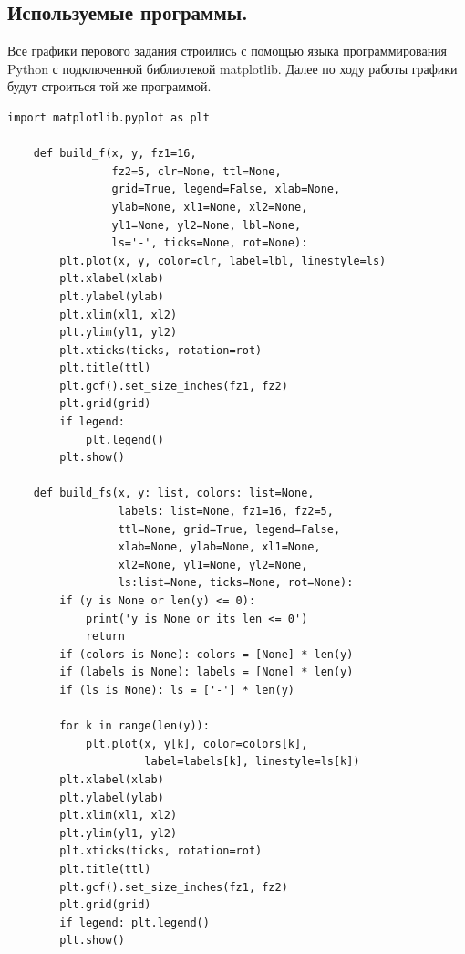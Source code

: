 \documentclass[a4paper, 12pt]{article}
\begin{document}
    \subsection{Используемые программы.}
    Все графики перового задания строились с помощью языка программирования Python с подключенной библиотекой matplotlib. Далее
    по ходу работы графики будут строиться той же программой. 
    \begin{lstlisting}[label=task1, caption={Файл с программой для построения графиков.}]
    import matplotlib.pyplot as plt

    def build_f(x, y, fz1=16,
                fz2=5, clr=None, ttl=None,
                grid=True, legend=False, xlab=None,
                ylab=None, xl1=None, xl2=None,
                yl1=None, yl2=None, lbl=None,
                ls='-', ticks=None, rot=None):
        plt.plot(x, y, color=clr, label=lbl, linestyle=ls)
        plt.xlabel(xlab)
        plt.ylabel(ylab)
        plt.xlim(xl1, xl2)
        plt.ylim(yl1, yl2)
        plt.xticks(ticks, rotation=rot)
        plt.title(ttl)
        plt.gcf().set_size_inches(fz1, fz2)
        plt.grid(grid)
        if legend:
            plt.legend()
        plt.show()
                
    def build_fs(x, y: list, colors: list=None,
                 labels: list=None, fz1=16, fz2=5,
                 ttl=None, grid=True, legend=False, 
                 xlab=None, ylab=None, xl1=None,
                 xl2=None, yl1=None, yl2=None,
                 ls:list=None, ticks=None, rot=None):
        if (y is None or len(y) <= 0):
            print('y is None or its len <= 0')
            return
        if (colors is None): colors = [None] * len(y)
        if (labels is None): labels = [None] * len(y)
        if (ls is None): ls = ['-'] * len(y)
        
        for k in range(len(y)):
            plt.plot(x, y[k], color=colors[k],
                     label=labels[k], linestyle=ls[k])
        plt.xlabel(xlab)
        plt.ylabel(ylab)
        plt.xlim(xl1, xl2)
        plt.ylim(yl1, yl2)
        plt.xticks(ticks, rotation=rot)
        plt.title(ttl)
        plt.gcf().set_size_inches(fz1, fz2)
        plt.grid(grid)
        if legend: plt.legend()
        plt.show()
    \end{lstlisting}
\end{document}
